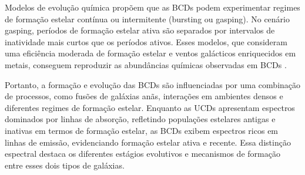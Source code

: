 Modelos de evolução química propõem que as BCDs podem experimentar regimes de formação estelar contínua ou intermitente (bursting ou gasping). No cenário gasping, períodos de formação estelar ativa são separados por intervalos de inatividade mais curtos que os períodos ativos. Esses modelos, que consideram uma eficiência moderada de formação estelar e ventos galácticos enriquecidos em metais, conseguem reproduzir as abundâncias químicas observadas em BCDs \citep{Yin_2011}.

Portanto, a formação e evolução das BCDs são influenciadas por uma combinação de processos, como fusões de galáxias anãs, interações em ambientes densos e diferentes regimes de formação estelar. Enquanto as UCDs apresentam espectros dominados por linhas de absorção, refletindo populações estelares antigas e inativas em termos de formação estelar, as BCDs exibem espectros ricos em linhas de emissão, evidenciando formação estelar ativa e recente. Essa distinção espectral destaca os diferentes estágios evolutivos e mecanismos de formação entre esses dois tipos de galáxias.









